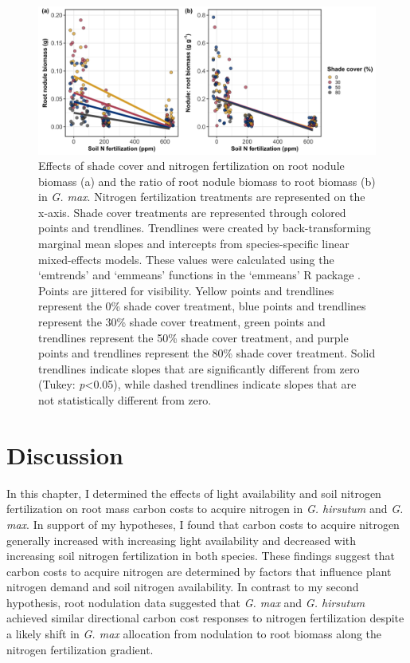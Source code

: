 \newpage
\begin{landscape}

\begin{figure}
    \centering
    \includegraphics[scale = 0.061]{ch2_LxN_Greenhouse/figs/fig4_nodwgt.png}
    \caption[Effects of shade cover and nitrogen fertilization on root nodule biomass and the ratio of root nodule biomass to root biomass in \textit{G. max}.]{Effects of shade cover and nitrogen fertilization on root nodule biomass (a) and the ratio of root nodule biomass to root biomass (b) in \textit{G. max}. Nitrogen fertilization treatments are represented on the x-axis. Shade cover treatments are represented through colored points and trendlines. Trendlines were created by back-transforming marginal mean slopes and intercepts from species-specific linear mixed-effects models. These values were calculated using the ‘emtrends’ and ‘emmeans’ functions in the ‘emmeans’ R package . Points are jittered for visibility. Yellow points and trendlines represent the 0\% shade cover treatment, blue points and trendlines represent the 30\% shade cover treatment, green points and trendlines represent the 50\% shade cover treatment, and purple points and trendlines represent the 80\% shade cover treatment. Solid trendlines indicate slopes that are significantly different from zero (Tukey: \textit{p}<0.05), while dashed trendlines indicate slopes that are not statistically different from zero.}
    \label{fig:figure2.4}
\end{figure}
\end{landscape}
\clearpage

\section{Discussion}
\noindent In this chapter, I determined the effects of light availability and soil nitrogen fertilization on root mass carbon costs to acquire nitrogen in \textit{G. hirsutum} and \textit{G. max}. In support of my hypotheses, I found that carbon costs to acquire nitrogen generally increased with increasing light availability and decreased with increasing soil nitrogen fertilization in both species. These findings suggest that carbon costs to acquire nitrogen are determined by factors that influence plant nitrogen demand and soil nitrogen availability. In contrast to my second hypothesis, root nodulation data suggested that \textit{G. max} and \textit{G. hirsutum} achieved similar directional carbon cost responses to nitrogen fertilization despite a likely shift in \textit{G. max} allocation from nodulation to root biomass along the nitrogen fertilization gradient.

